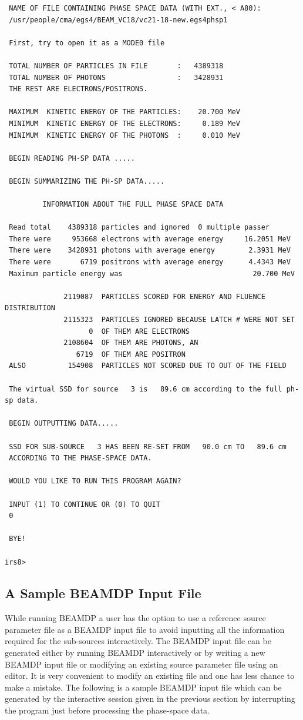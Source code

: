 \documentclass[12pt,twoside]{article}
\begin{document}
\begin{verbatim}
 NAME OF FILE CONTAINING PHASE SPACE DATA (WITH EXT., < A80):
 /usr/people/cma/egs4/BEAM_VC18/vc21-18-new.egs4phsp1

 First, try to open it as a MODE0 file

 TOTAL NUMBER OF PARTICLES IN FILE       :   4389318
 TOTAL NUMBER OF PHOTONS                 :   3428931
 THE REST ARE ELECTRONS/POSITRONS.

 MAXIMUM  KINETIC ENERGY OF THE PARTICLES:    20.700 MeV
 MINIMUM  KINETIC ENERGY OF THE ELECTRONS:     0.189 MeV
 MINIMUM  KINETIC ENERGY OF THE PHOTONS  :     0.010 MeV

 BEGIN READING PH-SP DATA .....

 BEGIN SUMMARIZING THE PH-SP DATA.....

         INFORMATION ABOUT THE FULL PHASE SPACE DATA

 Read total    4389318 particles and ignored  0 multiple passer
 There were     953668 electrons with average energy     16.2051 MeV
 There were    3428931 photons with average energy        2.3931 MeV
 There were       6719 positrons with average energy      4.4343 MeV
 Maximum particle energy was                               20.700 MeV

              2119087  PARTICLES SCORED FOR ENERGY AND FLUENCE DISTRIBUTION
              2115323  PARTICLES IGNORED BECAUSE LATCH # WERE NOT SET
                    0  OF THEM ARE ELECTRONS
              2108604  OF THEM ARE PHOTONS, AN
                 6719  OF THEM ARE POSITRON
 ALSO          154908  PARTICLES NOT SCORED DUE TO OUT OF THE FIELD

 The virtual SSD for source   3 is   89.6 cm according to the full ph-sp data.

 BEGIN OUTPUTTING DATA.....

 SSD FOR SUB-SOURCE   3 HAS BEEN RE-SET FROM   90.0 cm TO   89.6 cm
 ACCORDING TO THE PHASE-SPACE DATA.

 WOULD YOU LIKE TO RUN THIS PROGRAM AGAIN?

 INPUT (1) TO CONTINUE OR (0) TO QUIT
 0

 BYE!

irs8>

\end{verbatim}

\subsection{A Sample BEAMDP Input File}
While running BEAMDP a user has the option to use a  reference source parameter file as a
BEAMDP input file to avoid inputting all the information required for the sub-sources interactively.
The BEAMDP input file can be generated either by running BEAMDP interactively or by writing a new BEAMDP input file or modifying an existing source parameter file using an editor. It is very convenient to modify an existing file and one has less chance to make a mistake. The following is a sample BEAMDP input file which can be generated by the interactive session given in the previous section by interrupting the program just before processing the phase-space data.
\end{document}
